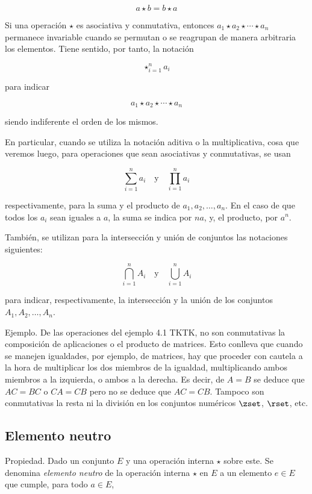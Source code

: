 $$ a \star b = b \star a $$

Si una operación $\star$ es asociativa y conmutativa, entonces $a_1 \star
a_2 \star \cdots \star a_n$ permanece invariable cuando se permutan o se
reagrupan de manera arbitraria los elementos. Tiene sentido, por tanto, la
notación

$$ \star_{i=1}^n a_i $$

\noindent para indicar

$$ a_1 \star a_2 \star \cdots \star a_n $$

\noindent siendo indiferente el orden de los mismos.

En particular, cuando se utiliza la notación aditiva o la multiplicativa,
cosa que veremos luego, para operaciones que sean asociativas y
conmutativas, se usan

$$ \sum_{i=1}^n a_i \quad \text{y} \quad \prod_{i=1}^n a_i $$

\noindent respectivamente, para la suma y el producto de $a_1, a_2, \ldots,
a_n$. En el caso de que todos los $a_i$ sean iguales a $a$, la suma se
indica por $na$, y, el producto, por $a^n$.

También, se utilizan para la intersección y unión de conjuntos las
notaciones siguientes:

$$ \bigcap_{i=1}^n A_i \quad \text{y} \quad \bigcup_{i=1}^n A_i $$

\noindent para indicar, respectivamente, la intersección y la unión de los
conjuntos $A_1, A_2, \ldots, A_n$.

Ejemplo. De las operaciones del ejemplo 4.1 TKTK, no son conmutativas la
composición de aplicaciones o el producto de matrices. Esto conlleva que
cuando se manejen igualdades, por ejemplo, de matrices, hay que proceder con
cautela a la hora de multiplicar los dos miembros de la igualdad,
multiplicando ambos miembros a la izquierda, o ambos a la derecha. Es decir,
de $A = B$ se deduce que $AC = BC$ o $CA = CB$ pero no se deduce que $AC =
CB$. Tampoco son conmutativas la resta ni la división en los conjuntos
numéricos $\zset$, $\rset$, etc.




\subsection{Elemento neutro}

Propiedad. Dado un conjunto $E$ y una operación interna $\star$ sobre este.
Se denomina \emph{elemento neutro} de la operación interna $\star$ en $E$ a
un elemento $e \in E$ que cumple, para todo $a \in E$,

